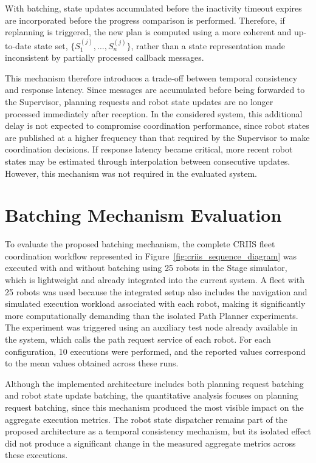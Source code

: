 With batching, state updates accumulated before the inactivity timeout expires are incorporated before the progress comparison is performed. Therefore, if replanning is triggered, the new plan is computed using a more coherent and up-to-date state set, $\{S_1^{(j)}, \ldots, S_n^{(j)}\}$, rather than a state representation made inconsistent by partially processed callback messages.

This mechanism therefore introduces a trade-off between temporal consistency and response latency. Since messages are accumulated before being forwarded to the Supervisor, planning requests and robot state updates are no longer processed immediately after reception. In the considered system, this additional delay is not expected to compromise coordination performance, since robot states are published at a higher frequency than that required by the Supervisor to make coordination decisions. If response latency became critical, more recent robot states may be estimated through interpolation between consecutive updates. However, this mechanism was not required in the evaluated system.


\section{Batching Mechanism Evaluation}
\label{sec:batching_evaluation}
\hspace{\parindent}
To evaluate the proposed batching mechanism, the complete CRIIS fleet coordination workflow
represented in Figure~\ref{fig:criis_sequence_diagram} was executed with and without batching
using 25 robots in the Stage simulator, which is lightweight and already integrated into the current
system. A fleet with 25 robots was used because the integrated setup also includes the navigation and
simulated execution workload associated with each robot, making it significantly more
computationally demanding than the isolated Path Planner experiments. The experiment was
triggered using an auxiliary test node already available in the system, which calls the path request
service of each robot. For each configuration, 10 executions were performed, and the reported
values correspond to the mean values obtained across these runs.

Although the implemented architecture includes both planning request batching and robot state
update batching, the quantitative analysis focuses on planning request batching, since this
mechanism produced the most visible impact on the aggregate execution metrics. The robot state
dispatcher remains part of the proposed architecture as a temporal consistency mechanism, but its
isolated effect did not produce a significant change in the measured aggregate metrics across these
executions.

